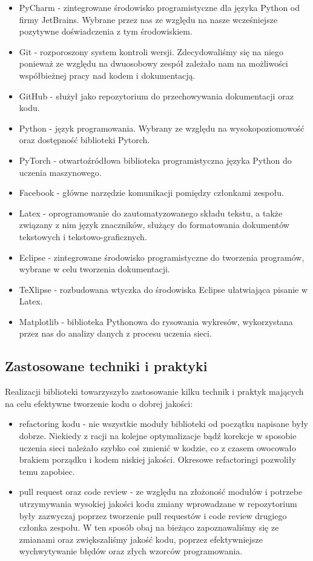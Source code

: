 \begin{itemize}
  \item PyCharm - zintegrowane środowisko programistyczne dla języka Python od firmy JetBrains.
  Wybrane przez nas ze względu na nasze wcześniejsze pozytywne doświadczenia z tym środowiskiem.
  \item Git - rozporoszony system kontroli wersji. Zdecydowaliśmy się na niego ponieważ ze względu na 
  dwuosobowy zespół zależało nam na możliwości współbieżnej pracy nad kodem i dokumentacją.
  \item GitHub - służył jako repozytorium do przechowywania dokumentacji oraz kodu.
  \item Python - język programowania. Wybrany ze względu na wysokopoziomowość oraz dostępność biblioteki Pytorch.
  \item PyTorch - otwartoźródłowa biblioteka programistyczna języka Python do uczenia maszynowego.
  \item Facebook - główne narzędzie komunikacji pomiędzy członkami zespołu.
  \item Latex - oprogramowanie do zautomatyzowanego składu tekstu, a także związany z nim język 
  znaczników, służący do formatowania dokumentów tekstowych i tekstowo-graficznych. 
  \item Eclipse - zintegrowane środowisko programistyczne do tworzenia programów, wybrane w celu tworzenia 
  dokumentacji.
  \item TeXlipse - rozbudowana wtyczka do środowiska Eclipse ułatwiająca pisanie w Latex.  
  \item Matplotlib - biblioteka Pythonowa do rysowania wykresów, wykorzystana przez nas do analizy danych 
  z procesu uczenia sieci. 
\end{itemize}

\subsection{Zastosowane techniki i praktyki}
Realizacji biblioteki towarzyszyło zastosowanie kilku technik i praktyk mających na celu efektywne 
tworzenie kodu o dobrej jakości:
\begin{itemize}
  \item refactoring kodu - nie wszystkie moduły biblioteki od początku napisane były dobrze. Niekiedy z racji 
  na kolejne optymalizacje bądź korekcje w sposobie uczenia sieci należało szybko coś zmienić w kodzie,
  co z czasem owocowało brakiem porządku i kodem niskiej jakości. Okresowe refactoringi pozwoliły temu zapobiec.
  \item pull request oraz code review - ze względu na złożoność modułów i potrzebe utrzymywania wysokiej
  jakości kodu zmiany wprowadzane w repozytorium były zazwyczaj poprzez tworzenie pull requestów i code review
  drugiego członka zespołu. W ten sposób obaj na bieżąco zapoznawaliśmy się ze zmianami oraz zwiększaliśmy
  jakość kodu, poprzez efektywniejsze wychwytywanie błędów oraz złych wzorców programowania.
\end{itemize}

